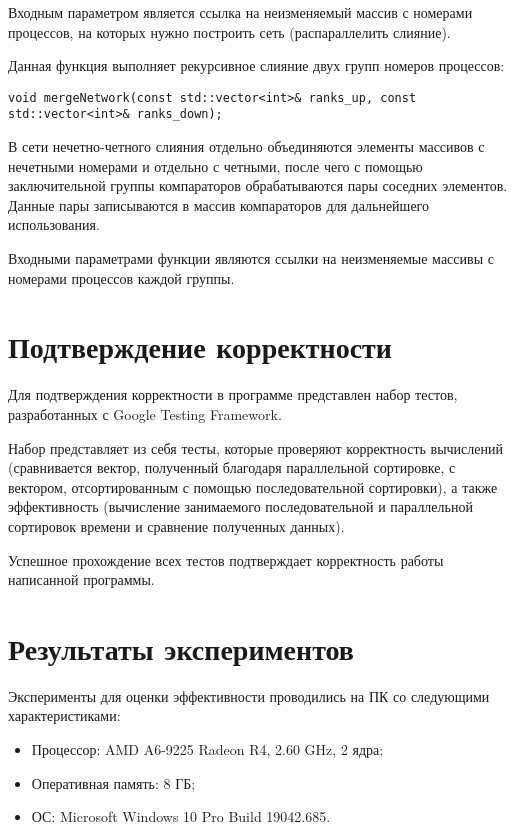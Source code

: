 \documentclass{report}
\begin{document}
\par Входным параметром является ссылка на неизменяемый массив с номерами процессов, на которых нужно построить сеть (распараллелить слияние).
\par Данная функция выполняет рекурсивное слияние двух групп номеров процессов:
\begin{lstlisting}
void mergeNetwork(const std::vector<int>& ranks_up, const std::vector<int>& ranks_down);
\end{lstlisting}
\par В сети нечетно-четного слияния отдельно объединяются элементы массивов с нечетными номерами и отдельно с четными, после чего с помощью заключительной группы компараторов обрабатываются пары соседних элементов. Данные пары записываются в массив компараторов для дальнейшего использования.
\par Входными параметрами функции являются ссылки на неизменяемые массивы с номерами процессов каждой группы.
\newpage

\section*{Подтверждение корректности}
Для подтверждения корректности в программе представлен набор тестов, разработанных с Google Testing Framework.
\par Набор представляет из себя тесты, которые проверяют корректность вычислений (сравнивается вектор, полученный благодаря параллельной сортировке, с вектором, отсортированным с помощью последовательной сортировки), а также эффективность (вычисление занимаемого последовательной и параллельной сортировок времени и сравнение полученных данных).
\par Успешное прохождение всех тестов подтверждает корректность работы написанной программы.
\newpage

\section*{Результаты экспериментов}
Эксперименты для оценки эффективности проводились на ПК со следующими характеристиками:

\begin{itemize}
\item Процессор: AMD A6-9225 Radeon R4, 2.60 GHz, 2 ядра;
\item Оперативная память: 8 ГБ;
\item ОС: Microsoft Windows 10 Pro Build 19042.685.
\end{itemize}
\end{document}

